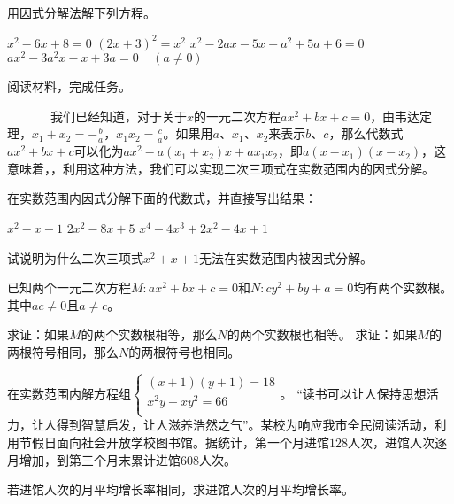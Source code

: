 \documentclass[10pt]{article}
\begin{document}
\begin{questions}{\answeringintroduction}
    \question 用因式分解法解下列方程。
    \begin{subquestions}
        \subquestion $x^2-6x+8=0$
        \subquestion $(2x+3)^2=x^2$
        \subquestion $x^2-2ax-5x+a^2+5a+6=0$
        \subquestion $ax^2-3a^2x-x+3a=0 \ \ \ \ \ (a \neq 0)$
    \end{subquestions}
    \addspace{}
    \question 阅读材料，完成任务。\par
    ~~~~~~~我们已经知道，对于关于$x$的一元二次方程$ax^2+bx+c=0$，由韦达定理，$x_1+x_2=-\frac{b}{a}$，$x_1x_2=\frac{c}{a}$。如果用$a$、$x_1$、$x_2$来表示$b$、$c$，那么代数式$ax^2+bx+c$可以化为$ax^2-a(x_1+x_2)x+ax_1x_2$，即$a(x-x_1)(x-x_2)$，这意味着，，利用这种方法，我们可以实现二次三项式在实数范围内的因式分解。
    \begin{subquestions}
        \subquestion 在实数范围内因式分解下面的代数式，并直接写出结果：
        \begin{subsubquestions}
            \subsubquestion $x^2-x-1$
            \subsubquestion $2x^2-8x+5$
            \subsubquestion $x^4-4x^3+2x^2-4x+1$
        \end{subsubquestions}
        \subquestion 试说明为什么二次三项式$x^2+x+1$无法在实数范围内被因式分解。
    \end{subquestions}
    \newpage
    \question 已知两个一元二次方程$M:ax^{2} + bx + c = 0$和$N:cy^{2} + by + a = 0$均有两个实数根。其中$ac \neq 0$且$a \neq c$。
    \begin{subquestions}
        \subquestion 求证：如果$M$的两个实数根相等，那么$N$的两个实数根也相等。
        \subquestion 求证：如果$M$的两根符号相同，那么$N$的两根符号也相同。
    \end{subquestions}
    \addspace{}
    \question 在实数范围内解方程组$\left\{ \begin{matrix}
        (x + 1)(y + 1) = 18 \\
        x^{2}y + xy^{2} = 66 \\
        \end{matrix} \right.$。
    \addspace{}
    \question ``读书可以让人保持思想活力，让人得到智慧启发，让人滋养浩然之气''。某校为响应我市全民阅读活动，利用节假日面向社会开放学校图书馆。据统计，第一个月进馆$128$人次，进馆人次逐月增加，到第三个月末累计进馆$608$人次。
    \begin{subquestions}
        \subquestion 若进馆人次的月平均增长率相同，求进馆人次的月平均增长率。

\end{subquestions}
\end{questions}
\end{document}
